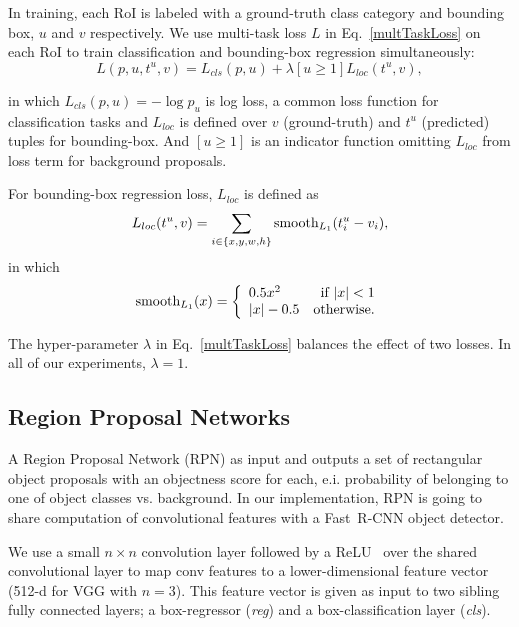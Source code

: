 \documentclass[conference]{IEEEtran}
\newcommand{\fast}[0]{\mbox{Fast~R-CNN}}
\begin{document}
In training, each RoI is labeled with a ground-truth class category and bounding box, $u$ and $v$ respectively. We use multi-task loss $L$ in Eq.~\eqref{multTaskLoss} on each RoI to train classification and bounding-box regression simultaneously:
\begin{equation}
\label{multTaskLoss}
L(p, u, t^u, v) = L_{cls}(p, u) + \lambda\left[u\geq 1\right]L_{loc}(t^u, v),
\end{equation}

in which $L_{cls}(p, u) = - \log p_u$ is log loss, a common loss function for classification tasks and $L_{loc}$ is defined over $v$ (ground-truth) and $t^u$ (predicted) tuples for bounding-box.
And $\left[u\geq 1\right]$ is an indicator function omitting $L_{loc}$ from loss term for background proposals.

For bounding-box regression loss, $L_{loc}$ is defined as
\begin{equation}
L_{loc}(t^u, v) = \sum_{i\in \{x, y, w, h\}} \textup{smooth}_{L_1}(t^u_i-v_i),
\label{regLoss}
\end{equation}
in which
\begin{equation}
\textup{smooth}_{L_1}(x)=\left\{ 
\begin{array}{lr}
0.5x^2 & \textup{if $|x| < 1$}\\
|x| - 0.5 & \textup{otherwise}.
\end{array}
\right.
\end{equation}

The hyper-parameter $\lambda$ in Eq.~\eqref{multTaskLoss} balances the effect of two losses. In all of our experiments, $\lambda = 1$.

\subsection{Region Proposal Networks}
A Region Proposal Network (RPN) as input and outputs a set of rectangular object proposals with an objectness score for each, e.i. probability of belonging to one of object classes vs. background.
In our implementation, RPN is going to share computation of convolutional features with a \fast{} object detector.

We use a small $n\times n$ convolution layer followed by a ReLU~\cite{b33} over the shared convolutional layer to map conv features to a lower-dimensional feature vector (512-d for VGG with $n=3$). This feature vector is given as input to two sibling fully connected layers; a box-regressor (\textit{reg}) and a box-classification layer (\textit{cls}).
\end{document}
